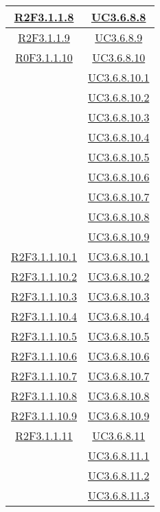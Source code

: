 \begin{longtable}{|c|c|}
\hline
\hyperlink{R2F3.1.1.8}{R2F3.1.1.8} & \hyperlink{UC3.6.8.8}{UC3.6.8.8}\\
\hline
\hyperlink{R2F3.1.1.9}{R2F3.1.1.9} & \hyperlink{UC3.6.8.9}{UC3.6.8.9}\\
\hline
\hyperlink{R0F3.1.1.10}{R0F3.1.1.10} & \hyperlink{UC3.6.8.10}{UC3.6.8.10}\\
& \hyperlink{UC3.6.8.10.1}{UC3.6.8.10.1}\\
& \hyperlink{UC3.6.8.10.2}{UC3.6.8.10.2}\\
& \hyperlink{UC3.6.8.10.3}{UC3.6.8.10.3}\\
& \hyperlink{UC3.6.8.10.4}{UC3.6.8.10.4}\\
& \hyperlink{UC3.6.8.10.5}{UC3.6.8.10.5}\\
& \hyperlink{UC3.6.8.10.6}{UC3.6.8.10.6}\\
& \hyperlink{UC3.6.8.10.7}{UC3.6.8.10.7}\\
& \hyperlink{UC3.6.8.10.8}{UC3.6.8.10.8}\\
& \hyperlink{UC3.6.8.10.9}{UC3.6.8.10.9}\\
\hline
\hyperlink{R2F3.1.1.10.1}{R2F3.1.1.10.1} & \hyperlink{UC3.6.8.10.1}{UC3.6.8.10.1}\\
\hline
\hyperlink{R2F3.1.1.10.2}{R2F3.1.1.10.2} & \hyperlink{UC3.6.8.10.2}{UC3.6.8.10.2}\\
\hline
\hyperlink{R2F3.1.1.10.3}{R2F3.1.1.10.3} & \hyperlink{UC3.6.8.10.3}{UC3.6.8.10.3}\\
\hline
\hyperlink{R2F3.1.1.10.4}{R2F3.1.1.10.4} & \hyperlink{UC3.6.8.10.4}{UC3.6.8.10.4}\\
\hline
\hyperlink{R2F3.1.1.10.5}{R2F3.1.1.10.5} & \hyperlink{UC3.6.8.10.5}{UC3.6.8.10.5}\\
\hline
\hyperlink{R2F3.1.1.10.6}{R2F3.1.1.10.6} & \hyperlink{UC3.6.8.10.6}{UC3.6.8.10.6}\\
\hline
\hyperlink{R2F3.1.1.10.7}{R2F3.1.1.10.7} & \hyperlink{UC3.6.8.10.7}{UC3.6.8.10.7}\\
\hline
\hyperlink{R2F3.1.1.10.8}{R2F3.1.1.10.8} & \hyperlink{UC3.6.8.10.8}{UC3.6.8.10.8}\\
\hline
\hyperlink{R2F3.1.1.10.9}{R2F3.1.1.10.9} & \hyperlink{UC3.6.8.10.9}{UC3.6.8.10.9}\\
\hline
\hyperlink{R2F3.1.1.11}{R2F3.1.1.11} & \hyperlink{UC3.6.8.11}{UC3.6.8.11}\\
& \hyperlink{UC3.6.8.11.1}{UC3.6.8.11.1}\\
& \hyperlink{UC3.6.8.11.2}{UC3.6.8.11.2}\\
& \hyperlink{UC3.6.8.11.3}{UC3.6.8.11.3}\\

\end{longtable}
